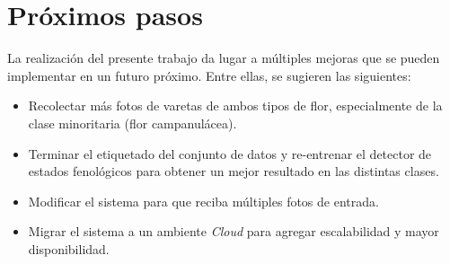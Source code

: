 \section{Próximos pasos}

La realización del presente trabajo da lugar a múltiples mejoras que se pueden implementar en un futuro próximo. Entre ellas, se sugieren las siguientes:

\begin{itemize}
\item Recolectar más fotos de varetas de ambos tipos de flor, especialmente de la clase minoritaria (flor campanulácea).
\item Terminar el etiquetado del conjunto de datos y re-entrenar el detector de estados fenológicos para obtener un mejor resultado en las distintas clases.
\item Modificar el sistema para que reciba múltiples fotos de entrada.
\item Migrar el sistema a un ambiente \textit{Cloud} para agregar escalabilidad y mayor disponibilidad.
\end{itemize}
